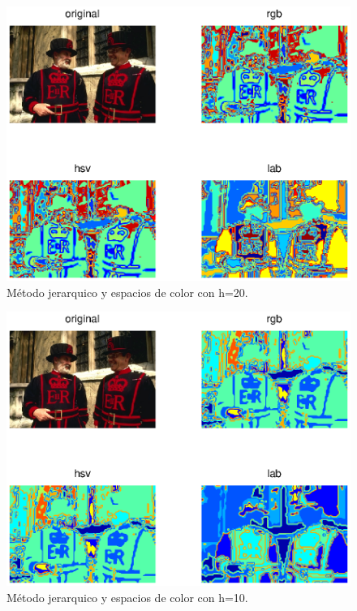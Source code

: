 \documentclass[10pt,twocolumn,letterpaper]{article}
\begin{document}
\begin{figure}[h]
\begin{center}
 \includegraphics[scale=0.6]{hierarchical1.eps}
\end{center}
   \caption{Método jerarquico y espacios de color con h=20. }
\label{fig:long}
\label{fig:onecol}
\end{figure}

\begin{figure}[h]
\begin{center}
 \includegraphics[scale=0.6]{jera.eps}
\end{center}
   \caption{Método jerarquico y espacios de color con h=10. }
\label{fig:long}
\label{fig:onecol}
\end{figure}
\end{document}
